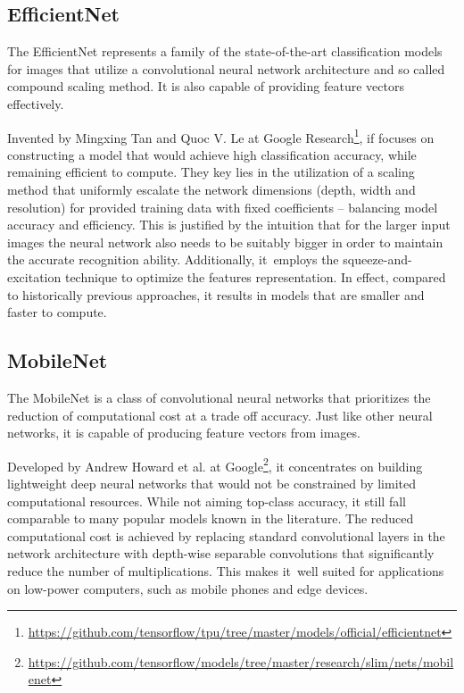 \subsection{EfficientNet}
\label{section:EfficientNet}

The EfficientNet represents a family of the state-of-the-art classification models for images that utilize a convolutional neural network architecture and so called compound scaling method. It is also capable of providing feature vectors effectively.

Invented by Mingxing Tan and Quoc V. Le \cite{Tan-2020} at Google Research\footnote{\url{https://github.com/tensorflow/tpu/tree/master/models/official/efficientnet}}, if focuses on constructing a model that would achieve high classification accuracy, while remaining efficient to compute. They key lies in the utilization of a scaling method that uniformly escalate the network dimensions (depth, width and resolution) for provided training data with fixed coefficients – balancing model accuracy and efficiency. This is justified by the intuition that for the larger input images the neural network also needs to be suitably bigger in order to maintain the accurate recognition ability. Additionally, it~employs the squeeze-and-excitation technique to optimize the features representation. In effect, compared to historically previous approaches, it results in models that are smaller and faster to compute.


\subsection{MobileNet}
\label{section:MobileNet}

The MobileNet is a class of convolutional neural networks that prioritizes the reduction of computational cost at a trade off accuracy. Just like other neural networks, it is capable of producing feature vectors from images.

Developed by Andrew Howard et al. \cite{Howard-2017} at Google\footnote{\url{https://github.com/tensorflow/models/tree/master/research/slim/nets/mobilenet}}, it concentrates on building lightweight deep neural networks that would not be constrained by limited computational resources. While not aiming top-class accuracy, it still fall comparable to many popular models known in the literature. The reduced computational cost is achieved by replacing standard convolutional layers in the network architecture with depth-wise separable convolutions that significantly reduce the number of multiplications. This makes it~well suited for applications on low-power computers, such as mobile phones and edge devices.


